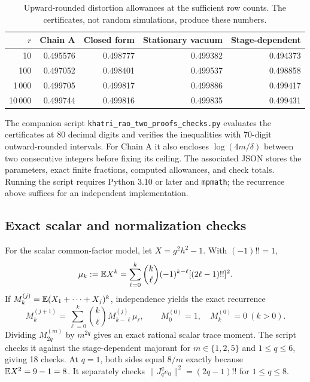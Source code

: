 \documentclass[11pt]{article}
\numberwithin{equation}{section}
\theoremstyle{definition}\newtheorem{definition}[theorem]{Definition}
\theoremstyle{remark}\newtheorem{remark}[theorem]{Remark}
\newcommand{\norm}[1]{\lVert#1\rVert}\newcommand{\ip}[2]{\langle#1,#2\rangle}
\begin{document}
\begin{table}[htbp]\centering
\small\renewcommand{\arraystretch}{1.25}\setlength{\tabcolsep}{8pt}
\begin{tabular}{@{}rrrrr@{}}
\toprule
$r$&Chain A&Closed form&Stationary vacuum&Stage-dependent\\
\midrule
10&0.495576&0.498777&0.499382&0.494373\\
100&0.497052&0.498401&0.499537&0.498858\\
1\,000&0.499705&0.499817&0.499886&0.499417\\
10\,000&0.499744&0.499816&0.499835&0.499431\\
\bottomrule
\end{tabular}
\caption{Upward-rounded distortion allowances at the sufficient row counts.
The certificates, not random simulations, produce these numbers.}\label{tab:allowances}
\end{table}

The companion script \texttt{khatri\_rao\_two\_proofs\_checks.py} evaluates the
certificates at 80 decimal digits and verifies the inequalities with
70-digit outward-rounded intervals. For Chain A it also encloses
$\log(4m/\delta)$ between two consecutive integers before fixing its ceiling.
The associated JSON stores the parameters, exact finite fractions, computed
allowances, and check totals. Running the script requires Python 3.10 or later
and \texttt{mpmath}; the recurrence above suffices for an independent implementation.

\subsection{Exact scalar and normalization checks}
For the scalar common-factor model, let $X=g^2h^2-1$. With $(-1)!!=1$,
\begin{equation}\label{eq:scalar-check}
 \mu_k:=\mathbb E X^k
 =\sum_{\ell=0}^k\binom{k}{\ell}(-1)^{k-\ell}[(2\ell-1)!!]^2.
\end{equation}
If $M_k^{(j)}=\mathbb E(X_1+\cdots+X_j)^k$, independence yields the exact recurrence
\[
 M_k^{(j+1)}=\sum_{\ell=0}^k\binom{k}{\ell}M_{k-\ell}^{(j)}\mu_\ell,
 \qquad M_0^{(0)}=1,\quad M_k^{(0)}=0\ (k>0).
\]
Dividing $M_{2q}^{(m)}$ by $m^{2q}$ gives an exact rational scalar trace moment.
The script checks it against the stage-dependent majorant for
$m\in\{1,2,5\}$ and $1\le q\le6$, giving 18 checks.
At $q=1$, both sides equal $8/m$ exactly because $\mathbb E X^2=9-1=8$.
It separately checks
$\norm{J_q^qe_0}^2=(2q-1)!!$ for $1\le q\le8$.
\end{document}
